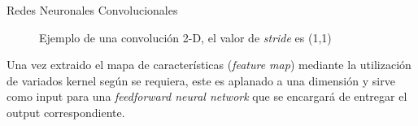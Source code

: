 \documentclass[9pt]{beamer}
\begin{document}
\begin{frame}{Redes Neuronales Convolucionales}

\begin{figure}[H]
    \centering
    \caption{Ejemplo de una convolución 2-D, el valor de \textit{stride} es (1,1) \cite{Goodfellow-et-al-2016}}
\end{figure} \pause 

Una vez extraido el mapa de características (\textit{feature map}) mediante la utilización de variados kernel según se requiera, este es aplanado a una dimensión y sirve como input para una \textit{feedforward neural network} que se encargará de entregar el output correspondiente. 

\end{frame}
\end{document}
